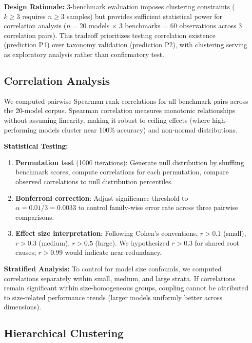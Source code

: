 \textbf{Design Rationale:} 3-benchmark evaluation imposes clustering constraints ($k \geq 3$ requires $n \geq 3$ samples) but provides sufficient statistical power for correlation analysis ($n=20$ models $\times$ 3 benchmarks = 60 observations across 3 correlation pairs). This tradeoff prioritizes testing correlation existence (prediction P1) over taxonomy validation (prediction P2), with clustering serving as exploratory analysis rather than confirmatory test.

\subsection{Correlation Analysis}

We computed pairwise Spearman rank correlations for all benchmark pairs across the 20-model corpus. Spearman correlation measures monotonic relationships without assuming linearity, making it robust to ceiling effects (where high-performing models cluster near 100\% accuracy) and non-normal distributions.

\textbf{Statistical Testing:}
\begin{enumerate}
\item \textbf{Permutation test} (1000 iterations): Generate null distribution by shuffling benchmark scores, compute correlations for each permutation, compare observed correlations to null distribution percentiles.
\item \textbf{Bonferroni correction}: Adjust significance threshold to $\alpha = 0.01 / 3 = 0.0033$ to control family-wise error rate across three pairwise comparisons.
\item \textbf{Effect size interpretation}: Following Cohen's conventions, $r > 0.1$ (small), $r > 0.3$ (medium), $r > 0.5$ (large). We hypothesized $r > 0.3$ for shared root causes; $r > 0.99$ would indicate near-redundancy.
\end{enumerate}

\textbf{Stratified Analysis:} To control for model size confounds, we computed correlations separately within small, medium, and large strata. If correlations remain significant within size-homogeneous groups, coupling cannot be attributed to size-related performance trends (larger models uniformly better across dimensions).

\subsection{Hierarchical Clustering}

